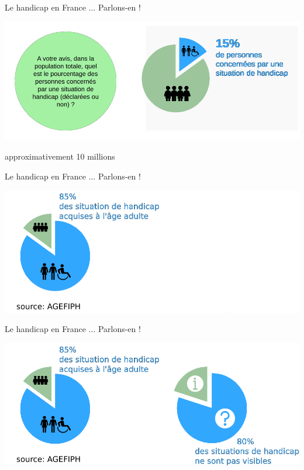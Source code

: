 \documentclass{beamer}
\begin{document}
\begin{frame}
 {Le handicap en France ... Parlons-en ! } 
 
 \includegraphics[width=1\linewidth]{images/handicap_cake1.png} 
 
\centering \large approximativement 10 millions
 
\end{frame}


\begin{frame}
 {Le handicap en France ... Parlons-en ! } 
 
 \includegraphics[width=1\linewidth]{images/handicap_cake2.png} 
 
\end{frame}


\begin{frame}
 {Le handicap en France ... Parlons-en ! } 
 
 \includegraphics[width=1\linewidth]{images/handicap_cake3.png} 
 
\end{frame}
\end{document}
